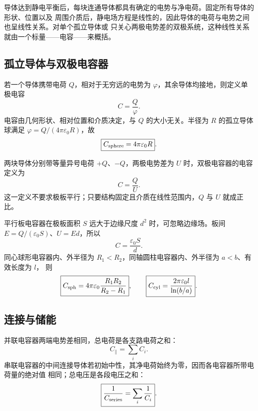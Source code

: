 

\iffalse
导体达到静电平衡后，每块连通导体都具有确定的电势与净电荷。固定所有导体的形状、位置以及
周围介质后，静电场方程是线性的，因此导体的电荷与电势之间也呈线性关系。对单个孤立导体或
只关心两极电势差的双极系统，这种线性关系就由一个标量——电容——来概括。

\subsection*{孤立导体与双极电容器}

若一个导体携带电荷 $Q$，相对于无穷远的电势为 $\varphi$，其余导体均接地，则定义单极电容
\begin{equation}
  \boxed{C=\frac{Q}{\varphi}}.
\end{equation}
电容由几何形状、相对位置和介质决定，与 $Q$ 的大小无关。半径为 $R$ 的孤立导体球满足
$\varphi=Q/(4\pi\varepsilon_0R)$，故
\begin{equation}
  \boxed{C_{\rm sphere}=4\pi\varepsilon_0R}.
\end{equation}

两块导体分别带等量异号电荷 $+Q$、$-Q$，两极电势差为 $U$ 时，双极电容器的电容定义为
\begin{equation}
  \boxed{C=\frac QU}.
\end{equation}
这一定义不要求极板平行；只要结构固定且介质在线性范围内，$Q$ 与 $U$ 就成正比。

平行板电容器在极板面积 $S$ 远大于边缘尺度 $d^2$ 时，可忽略边缘场。板间
$E=Q/(\varepsilon_0S)$、$U=Ed$，所以
\begin{equation}
  \boxed{C=\frac{\varepsilon_0S}{d}}.
\end{equation}
同心球形电容器内、外半径为 $R_1<R_2$，同轴圆柱电容器内、外半径为 $a<b$、有效长度为 $l$，
则
\begin{equation}
  \boxed{C_{\rm sph}=4\pi\varepsilon_0\frac{R_1R_2}{R_2-R_1}},
  \qquad
  \boxed{C_{\rm cyl}=\frac{2\pi\varepsilon_0l}{\ln(b/a)}}.
\end{equation}

\capacitorGeometryDiagram

\subsection*{连接与储能}

并联电容器两端电势差相同，总电荷是各支路电荷之和：
\begin{equation}
  \boxed{C_{\parallel}=\sum_iC_i}.
\end{equation}
串联电容器的中间连接导体若初始中性，其净电荷始终为零，因而各电容器所带电荷量的绝对值
相同；总电压是各段电压之和：
\begin{equation}
  \boxed{\frac1{C_{\rm series}}=\sum_i\frac1{C_i}}.
\end{equation}

